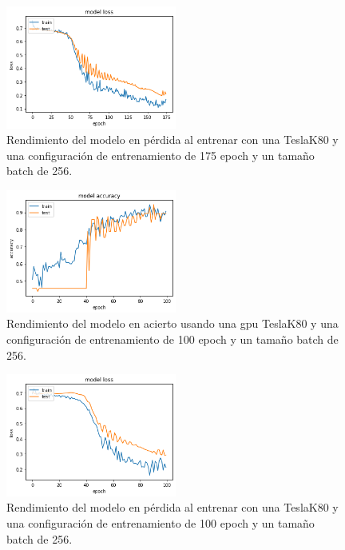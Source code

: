\begin{figure}
    \centering
    \includegraphics[width=0.5\textwidth]{images/chapter5/batch_256_175_epoch_loss.png}
    \caption{Rendimiento del modelo en pérdida al entrenar con una TeslaK80 y una configuración de entrenamiento de 175 epoch y un tamaño batch de 256.}
    \label{fig:Resultados de loss en el entrenamiento con un batch-size de 256 y 175 epochs}
\end{figure}

\begin{figure}
    \centering
    \includegraphics[width=0.5\textwidth]{images/chapter5/batch_256_100_epoch.png}
    \caption{Rendimiento del modelo en acierto usando una gpu TeslaK80 y una configuración de entrenamiento de 100 epoch y un tamaño batch de 256.}
    \label{fig:Resultados de la precisión de entrenamiento con un batch-size de 256 y 100 epochs}
\end{figure}

\begin{figure}
    \centering
    \includegraphics[width=0.5\textwidth]{images/chapter5/batch_256_100_epoch_loss.png}
    \caption{Rendimiento del modelo en pérdida al entrenar con una TeslaK80 y una configuración de entrenamiento de 100 epoch y un tamaño batch de 256.}
    \label{fig:Resultados de loss en el entrenamiento con un batch-size de 256 y 100 epochs}
\end{figure}

